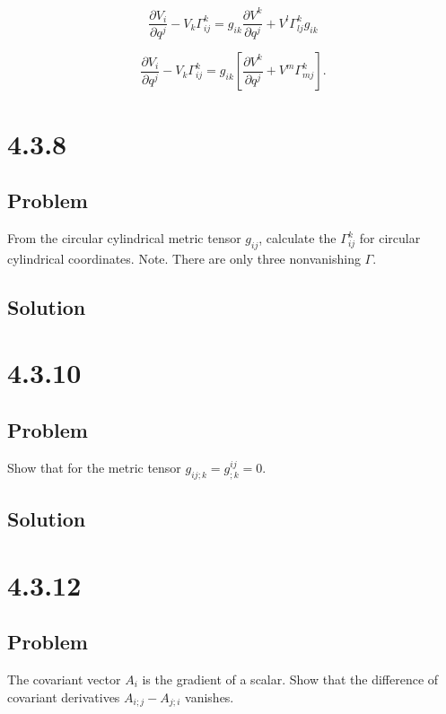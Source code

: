 \documentclass[12pt]{article}
\begin{document}
\[
    \frac{\partial V_i}{\partial q^j} - V_k \Gamma_{i j}^k
    = g_{ik} \frac{\partial V^k}{\partial q^j}
    + V^l \Gamma_{l j}^k g_{ik}
\]

\[
    \frac{\partial V_i}{\partial q^j}-V_k \Gamma_{i j}^k=g_{i k}\left[\frac{\partial V^k}{\partial q^j}+V^m \Gamma_{m j}^k\right] .
\]

\newpage
\section{4.3.8}

\subsection{Problem}

From the circular cylindrical metric tensor \(g_{i j}\), calculate the \(\Gamma_{i j}^k\) for circular cylindrical coordinates.
Note. There are only three nonvanishing \(\Gamma\).

\subsection{Solution}

\newpage
\section{4.3.10}

\subsection{Problem}

Show that for the metric tensor \(g_{ij; k} = g^{ij}_{;k} = 0\).

\subsection{Solution}

\newpage
\section{4.3.12}

\subsection{Problem}

The covariant vector \(A_i\) is the gradient of a scalar. Show that the difference of covariant
derivatives \(A_{i;j} - A_{j;i}\) vanishes.
\end{document}
